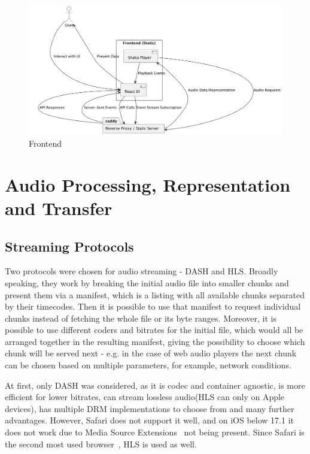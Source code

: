\begin{figure}[htbp]
    \centering
    \includegraphics[width=1\textwidth, keepaspectratio]{diagrams/frontend.png}
    \caption{Frontend}
    \label{fig:frontend}
\end{figure}


\section{Audio Processing, Representation and Transfer}

\subsection{Streaming Protocols}
Two protocols were chosen for audio streaming - DASH\cite{dash} and HLS\cite{hls}.
Broadly speaking, they work by breaking the initial audio file into smaller chunks and present them via a manifest,
which is a listing with all available chunks separated by their timecodes. Then it is possible to use that manifest
to request individual chunks instead of fetching the whole file or its byte ranges. Moreover, it is possible to use
different coders and bitrates for the initial file, which would all be arranged together in the resulting manifest, giving
the possibility to choose which chunk will be served next - e.g. in the case of web audio players the next chunk can
be chosen based on multiple parameters, for example, network conditions.

At first, only DASH was considered, as it is codec and container agnostic,
is more efficient for lower bitrates, can stream lossless audio(HLS can only on Apple devices),
has multiple DRM implementations to choose from and many further advantages.
However, Safari does not support it well, and on iOS below 17.1 it does not work due to
Media Source Extensions~\cite{mse,msecaniuse} not being present.
Since Safari is the second most used browser~\cite{browserusage}, HLS is used as well.

